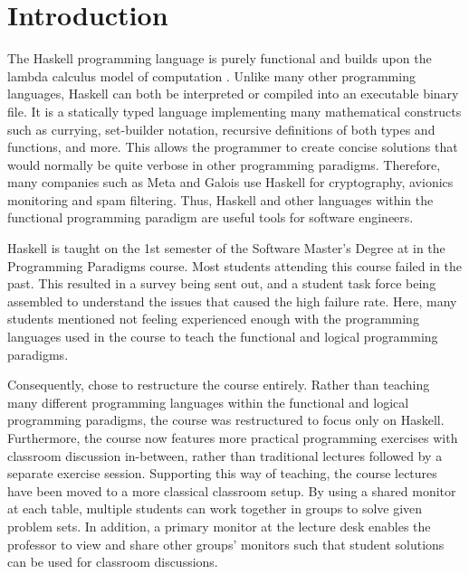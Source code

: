 \chapter{Introduction} \label{chap:introduction}
The Haskell programming language is purely functional\cite{} and builds upon the lambda calculus model of computation \cite{}.
Unlike many other programming languages, Haskell can both be interpreted or compiled into an executable binary file.
It is a statically typed language implementing many mathematical constructs such as currying, set-builder notation, recursive definitions of both types and functions, and more.
This allows the programmer to create concise solutions that would normally be quite verbose in other programming paradigms.
Therefore, many companies such as Meta and Galois use Haskell for cryptography, avionics monitoring and spam filtering.
Thus, Haskell and other languages within the functional programming paradigm are useful tools for software engineers.


Haskell is taught on the 1st semester of the Software Master's Degree at \aau{} in the Programming Paradigms course.
Most students attending this course failed in the past.
This resulted in a survey being sent out, and a student task force being assembled to understand the issues that caused the high failure rate.
Here, many students mentioned not feeling experienced enough with the programming languages used in the course to teach the functional and logical programming paradigms.


Consequently, \aau{} chose to restructure the course entirely.
Rather than teaching many different programming languages within the functional and logical programming paradigms, the course was restructured to focus only on Haskell.
Furthermore, the course now features more practical programming exercises with classroom discussion in-between, rather than traditional lectures followed by a separate exercise session.
Supporting this way of teaching, the course lectures have been moved to a more classical classroom setup.
By using a shared monitor at each table, multiple students can work together in groups to solve given problem sets.
In addition, a primary monitor at the lecture desk enables the professor to view and share other groups' monitors such that student solutions can be used for classroom discussions.


